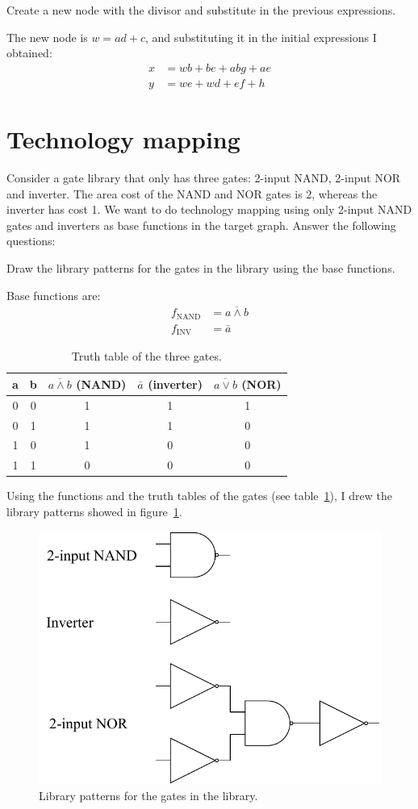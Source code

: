 \documentclass[a4paper, 10pt]{article}
\begin{document}
{\color{statement} Create a new node with the divisor and substitute in the previous expressions.}

The new node is $w = ad + c$, and substituting it in the initial expressions I obtained:
\begin{align*}
    x &= wb + be + abg + ae \\
    y &= we + wd + ef + h
\end{align*}

\section{Technology mapping}
{\color{statement} 
Consider a gate library that only has three gates: 2-input NAND, 2-input NOR and inverter. The area cost of the NAND and NOR gates is 2, whereas the inverter has cost 1. We want to do technology mapping using only 2-input NAND gates and inverters as base functions in the target graph. Answer the following questions:

Draw the library patterns for the gates in the library using the base functions.}

Base functions are:
\begin{align*}
    f_{\text{NAND}} &= \overline{a \land b} \\
    f_{\text{INV}}  &= \bar{a}
\end{align*}

\begin{table}[hbtp]
    \centering
    \begin{tabular}{|c c | c | c | c | }
        \hline
        a & b & $\overline{a \land b}$ (NAND)& $\bar{a}$ (inverter) & $\overline{a \lor b}$ (NOR) \\ \hline
        0 & 0 & 1 & 1 & 1 \\
        0 & 1 & 1 & 1 & 0 \\
        1 & 0 & 1 & 0 & 0 \\
        1 & 1 & 0 & 0 & 0 \\
        \hline
    \end{tabular}
    \caption{Truth table of the three gates.}
    \label{tab:gates_tt}
\end{table}

Using the functions and the truth tables of the gates (see table~\ref{tab:gates_tt}), I drew the library patterns showed in figure~\ref{fig:library_patterns}.
\begin{figure}[htbp]
    \centering
    \includegraphics[width=0.5\linewidth]{3_1.pdf}
    \caption{Library patterns for the gates in the library.}
    \label{fig:library_patterns}
\end{figure}
\end{document}

